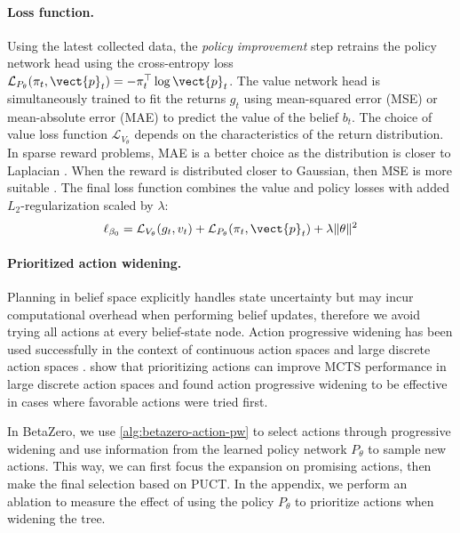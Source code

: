 \paragraph{Loss function.}
Using the latest collected data, the \textit{policy improvement} step retrains the policy network head using the cross-entropy loss $\mathcal{L}_{P_\theta}(\pi_t, \vect{p}_t) = -\pi_t^\top \log \vect{p}_t$.
The value network head is simultaneously trained to fit the returns $g_t$ using mean-squared error (MSE) or mean-absolute error (MAE) to predict the value of the belief $b_t$.
The choice of value loss function $\mathcal{L}_{V_\theta}$ depends on the characteristics of the return distribution.
In sparse reward problems,
MAE is a better choice as the distribution is closer to Laplacian \cite{hodson2022root}.
When the reward is distributed closer to Gaussian, then MSE is more suitable \cite{chai2014root}.
The final loss function combines the value and policy losses with added $L_2$-regularization scaled by $\lambda$:
\begin{equation}
    \ell_{\beta_0} = \mathcal{L}_{V_\theta}(g_t, v_t) + \mathcal{L}_{P_\theta}(\pi_t, \vect{p}_t) + \lambda\norm{\theta}^2
\end{equation}


\paragraph{Prioritized action widening.}
Planning in belief space explicitly handles state uncertainty but may incur computational overhead when performing belief updates, therefore we avoid trying all actions at every belief-state node.
Action progressive widening has been used successfully in the context of continuous action spaces \cite{moerland2018a0c} and large discrete action spaces \cite{yee2016monte}. 
\citeauthor{mern2021improved} show that prioritizing actions can improve MCTS performance in large discrete action spaces and \citeauthor{browne2012survey} found action progressive widening to be effective in cases where favorable actions were tried first.

In BetaZero, we use \cref{alg:betazero-action-pw} to select actions through progressive widening and use information from the learned policy network $P_\theta$ to sample new actions.
This way, we can first focus the expansion on promising actions, then make the final selection based on PUCT.
In the appendix, we perform an ablation to measure the effect of using the policy $P_\theta$ to prioritize actions when widening the tree.


